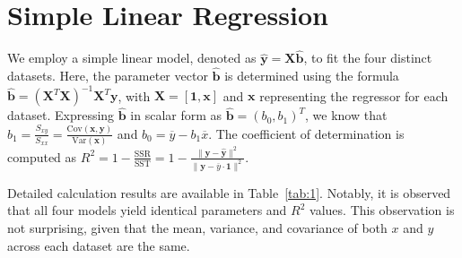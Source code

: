 \documentclass[12pt]{article}
\begin{document}
	\section{Simple Linear Regression}

%


We employ a simple linear model, denoted as $\hat{\mathbf{y}} = \mathbf{X}\hat{\mathbf{b}}$, to fit the four distinct datasets. Here, the parameter vector $\hat{\mathbf{b}}$ is determined using the formula $\hat{\mathbf{b}} = (\mathbf{X}^T\mathbf{X})^{-1}\mathbf{X}^T\mathbf{y}$, with $\mathbf{X} = [\mathbf{1}, \mathbf{x}]$ and $\mathbf{x}$ representing the regressor for each dataset. Expressing $\hat{\mathbf{b}}$ in scalar form as $\hat{\mathbf{b}} = \left( b_0,b_1 \right)^T$, we know that $b_1 = \frac{S_{xy}}{S_{xx}} = \frac{\text{Cov}(\mathbf{x},\mathbf{y})}{\text{Var}(\mathbf{x})}$ and $b_0 = \overline{y} - b_1 \overline{x}$. The coefficient of determination is computed as $R^2 = 1-\frac{\text{SSR}}{\text{SST}} = 1 - \frac{\rVert \mathbf{y} - \hat{\mathbf{y}}\rVert^2}{\rVert \mathbf{y} - \overline{y}\cdot\mathbf{1}\rVert^2}$. 

Detailed calculation results are available in Table~\ref{tab:1}. Notably, it is observed that all four models yield identical parameters and $R^2$ values. This observation is not surprising, given that the mean, variance, and covariance of both $x$ and $y$ across each dataset are the same.
\end{document}
